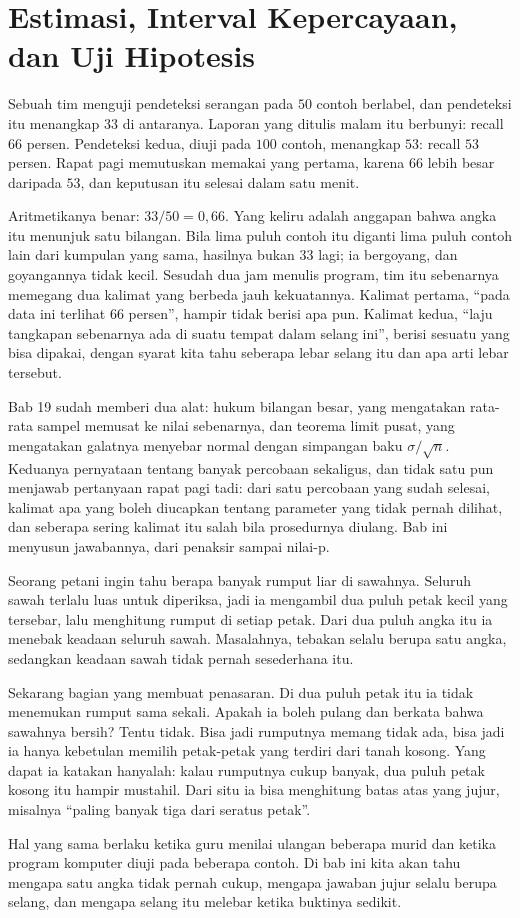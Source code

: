 \chapter{Estimasi, Interval Kepercayaan, dan Uji Hipotesis}

Sebuah tim menguji pendeteksi serangan pada $50$ contoh berlabel, dan pendeteksi itu
menangkap $33$ di antaranya. Laporan yang ditulis malam itu berbunyi: recall $66$
persen. Pendeteksi kedua, diuji pada $100$ contoh, menangkap $53$: recall $53$ persen.
Rapat pagi memutuskan memakai yang pertama, karena $66$ lebih besar daripada $53$, dan
keputusan itu selesai dalam satu menit.

Aritmetikanya benar: $33/50=0{,}66$. Yang keliru adalah anggapan bahwa angka itu
menunjuk satu bilangan. Bila lima puluh contoh itu diganti lima puluh contoh lain dari
kumpulan yang sama, hasilnya bukan $33$ lagi; ia bergoyang, dan goyangannya tidak
kecil. Sesudah dua jam menulis program, tim itu sebenarnya memegang dua kalimat yang
berbeda jauh kekuatannya. Kalimat pertama, ``pada data ini terlihat $66$ persen'',
hampir tidak berisi apa pun. Kalimat kedua, ``laju tangkapan sebenarnya ada di suatu
tempat dalam selang ini'', berisi sesuatu yang bisa dipakai, dengan syarat kita tahu
seberapa lebar selang itu dan apa arti lebar tersebut.

Bab 19 sudah memberi dua alat: hukum bilangan besar, yang mengatakan rata-rata sampel
memusat ke nilai sebenarnya, dan teorema limit pusat, yang mengatakan galatnya menyebar
normal dengan simpangan baku $\sigma/\sqrt n$. Keduanya pernyataan tentang banyak
percobaan sekaligus, dan tidak satu pun menjawab pertanyaan rapat pagi tadi: dari satu
percobaan yang sudah selesai, kalimat apa yang boleh diucapkan tentang parameter yang
tidak pernah dilihat, dan seberapa sering kalimat itu salah bila prosedurnya diulang.
Bab ini menyusun jawabannya, dari penaksir sampai nilai-p.

\begin{untukanak}
Seorang petani ingin tahu berapa banyak rumput liar di sawahnya. Seluruh sawah terlalu
luas untuk diperiksa, jadi ia mengambil dua puluh petak kecil yang tersebar, lalu
menghitung rumput di setiap petak. Dari dua puluh angka itu ia menebak keadaan seluruh
sawah. Masalahnya, tebakan selalu berupa satu angka, sedangkan keadaan sawah tidak pernah
sesederhana itu.

Sekarang bagian yang membuat penasaran. Di dua puluh petak itu ia tidak menemukan
rumput sama sekali. Apakah ia boleh pulang dan berkata bahwa sawahnya bersih? Tentu
tidak. Bisa jadi rumputnya memang tidak ada, bisa jadi ia hanya kebetulan memilih
petak-petak yang terdiri dari tanah kosong. Yang dapat ia katakan hanyalah: kalau
rumputnya cukup banyak, dua puluh petak kosong itu hampir mustahil. Dari situ ia bisa
menghitung batas atas yang jujur, misalnya ``paling banyak tiga dari seratus petak''.

Hal yang sama berlaku ketika guru menilai ulangan beberapa murid dan ketika program
komputer diuji pada beberapa contoh.
Di bab ini kita akan tahu mengapa satu angka tidak pernah cukup, mengapa jawaban jujur
selalu berupa selang, dan mengapa selang itu melebar ketika buktinya sedikit.
\end{untukanak}

